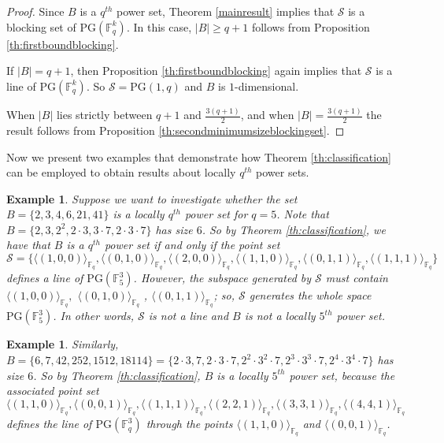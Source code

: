 \documentclass[12pt]{amsart}
\newtheorem{example}[theorem]{Example}
\newcommand{\F}{{\mathbb F}}
\newcommand{\fq}{{\mathbb F}_{q}}
\newcommand{\PG}{\mathrm{PG}}
\begin{document}
\begin{proof}
Since $B$ is a $q^{th}$ power set, Theorem \ref{mainresult} implies that $\mathcal{S}$ is a blocking set of $\PG(\F_{q}^{k})$. In this case, $\lvert B \rvert \geq q+1$ follows from Proposition \ref{th:firstboundblocking}. 

If $\lvert B \rvert = q+1$, then Proposition \ref{th:firstboundblocking} again implies that $\mathcal{S}$ is a line of $\PG(\F_{q}^{k})$. So $\mathcal{S}=\PG(1,q)$ and $B$ is $1$-dimensional. 

When $|B|$ lies strictly between $q+1$ and $\frac{3(q+1)}{2}$, and when $|B| = \frac{3(q+1)}{2}$ the result follows from Proposition \ref{th:secondminimumsizeblockingset}.
\end{proof}

Now we present two examples that demonstrate how Theorem \ref{th:classification} can be employed to obtain results about locally $q^{th}$ power sets. 
\begin{example}
Suppose we want to investigate whether the set $B=\{2,3,4,6,21,41\}$ is a locally $q^{th}$ power set for $q=5$. Note that $B=\{2,3,2^2,2 \cdot 3,3\cdot 7,2 \cdot 3 \cdot 7\}$ has size $6$. So by Theorem \ref{th:classification}, we have that $B$ is a $q^{th}$ power set if and only if the point set \[\mathcal{S} =\{ \langle (1,0,0)  \rangle_{\fq}, \langle (0,1,0)  \rangle_{\fq},\langle (2,0,0)  \rangle_{\fq},\langle (1,1,0)  \rangle_{\fq},\langle (0,1,1)  \rangle_{\fq},\langle (1,1,1)  \rangle_{\fq}\}\] defines a line of $\PG(\F_{5}^{3})$. However, the subspace generated by $\mathcal{S}$ must contain $\langle (1,0,0)  \rangle_{\fq},$ $\langle (0,1,0)  \rangle_{\fq}$ , $\langle (0,1,1)  \rangle_{\fq}$; so, $\mathcal{S}$ generates the whole space $\PG(\F_{5}^{3})$. In other words, $\mathcal{S}$ is not a line and $B$ is not a locally $5^{th}$ power set. 
\end{example}

\begin{example}
Similarly, $B=\{6,7,42,252,1512,18114\} =\{2 \cdot 3,7,2 \cdot 3 \cdot 7,2^2 \cdot 3^2 \cdot 7,2^3 \cdot 3^3 \cdot 7,2^4 \cdot 3^4 \cdot 7\}$ has size $6$. So by Theorem \ref{th:classification}, $B$ is a locally $5^{th}$ power set, because the associated point set \[\langle (1,1,0)  \rangle_{\fq}, \langle (0,0,1)  \rangle_{\fq},\langle (1,1,1)  \rangle_{\fq},\langle (2,2,1)  \rangle_{\fq}, \langle (3,3,1)  \rangle_{\fq},\langle (4,4,1)  \rangle_{\fq}\] defines the line of $\PG(\F_{q}^{3})$ through the points $ \langle (1,1,0)  \rangle_{\fq}$ and $\langle (0,0,1)  \rangle_{\fq}$. 
\end{example}
\end{document}
